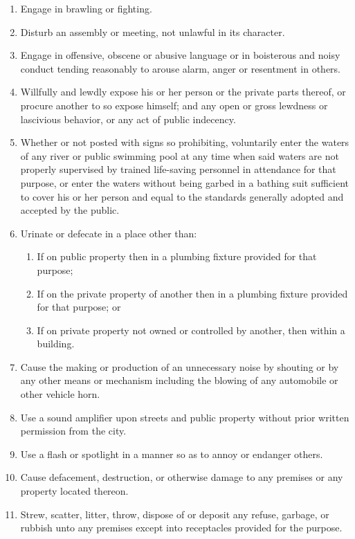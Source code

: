 \begin{enumerate}[{\indent}A)]
    \item Engage in brawling or fighting.
    \item Disturb an assembly or meeting, not unlawful in its character.
    \item Engage in offensive, obscene or abusive language or in boisterous and noisy conduct tending reasonably to arouse alarm, anger or resentment in others.
    \item Willfully and lewdly expose his or her person or the private parts thereof, or procure another to so expose himself; and any open or gross lewdness or lascivious behavior, or any act of public indecency.
    \item Whether or not posted with signs so prohibiting, voluntarily enter the waters of any river or public swimming pool at any time when said waters are not properly supervised by trained life-saving personnel in attendance for that purpose, or enter the waters without being garbed in a bathing suit sufficient to cover his or her person and equal to the standards generally adopted and accepted by the public.
    \item Urinate or defecate in a place other than:
        \begin{enumerate}
            \item If on public property then in a plumbing fixture provided for that purpose;
            \item If on the private property of another then in a plumbing fixture provided for that purpose; or
            \item If on private property not owned or controlled by another, then within a building.
        \end{enumerate}
    \item Cause the making or production of an unnecessary noise by shouting or by any other means or mechanism including the blowing of any automobile or other vehicle horn.
    \item Use a sound amplifier upon streets and public property without prior written permission from the city.
    \item Use a flash or spotlight in a manner so as to annoy or endanger others.
    \item Cause defacement, destruction, or otherwise damage to any premises or any property located thereon.
    \item Strew, scatter, litter, throw, dispose of or deposit any refuse, garbage, or rubbish unto any premises except into receptacles provided for the purpose.

\end{enumerate}
